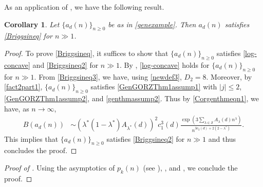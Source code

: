 \documentclass[11pt,reqno,a4paper]{amsart}
\renewcommand{\l}{\lambda}
\renewcommand{\(}{\left\(}
\renewcommand{\)}{\right\)}
\numberwithin{equation}{section}
\theoremstyle{plain}
\newtheorem{corollary}[theorem]{Corollary}
\theoremstyle{definition} %
\numberwithin{equation}{section}
\newcommand{\kbf}{\bf\color{green!40!black!60!}}
\begin{document}
As an application of , we have the following result.

\begin{corollary}\label{genthmcor1}
Let $\{a_d(n)\}_{n\ge 0}$ be as in \eqref{genexample}. Then $a_d(n)$ satisfies \eqref{Briggsineq} for $n\!\gg\!1$.
\end{corollary}
\begin{proof}
 To prove \eqref{Briggsineq}, it suffices to show that $\{a_d(n)\}_{n\ge 0}$ satisfies \eqref{log-concave} and \eqref{Briggsineq2} for $n\!\gg\!1$. By , \eqref{log-concave} holds for $\{a_d(n)\}_{n\ge 0}$ for $n\!\gg\!1$.  From \ref{Briggsineq3}, %
  we have, using \eqref{newdef3}, $D_2=8$. 
Moreover, by  \ref{fact2part1}, $\{a_d(n)\}_{n\ge 0}$ satisfies \ref{GenGORZThm1assump1} with $|j|\le 2$, \ref{GenGORZThm1assump2}, and \ref{genthmassump2}. Thus by  \ref{Corgenthmeqn1}, we have, as $n\to \infty$, 
	\begin{align*}
	B\left(a_d(n)\right)
	&\sim \left(\l^*(1-\l^*)A_{\l^*}(d)\right)^2c^3_1(d)\frac{\exp\left(3\sum_{\l\in \mathcal{S}}A_{\l}(d)n^{\l}\right)}{n^{3c_2(d)+2\left(2-\l^*\right)}}.
	\end{align*}
	This implies that $\{a_d(n)\}_{n\ge 0}$ satisfies \eqref{Briggsineq2} for $n\!\gg\!1$ and thus concludes the proof.\qedhere  
\end{proof}


\begin{proof}[Proof of ]
 Using the asymptotics of $p_k(n)$ (see \cite[equation (2.1)]{CP}),  , and , we conclude the proof.
\end{proof}
\end{document}
